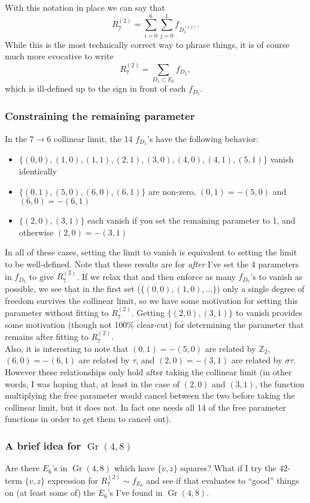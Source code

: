 \documentclass[12pt]{article}
\DeclareMathOperator{\Gr}{Gr}
\def\fd5{f_{D_5}}
\def\d5{D_5}
\def\e6{E_6}
\def\r27{R^{(2)}_7}
\begin{document}
With this notation in place we can say that 
\begin{equation}
	\r27 = \sum_{i=0}^{6}\sum_{j=0}^{1} f_{D_5^{(i,j)}}.
\end{equation}
While this is the most technically correct way to phrase things, it is of course much more evocative to write
\begin{equation}
	\r27 = \sum_{\d5\subset\e6} f_{D_5},
\end{equation}
which is ill-defined up to the sign in front of each $\fd5$. 


\subsubsection*{Constraining the remaining parameter}

In the $7\to6$ collinear limit, the 14 $\fd5$'s have the following behavior:

\begin{itemize}
	\item $\{(0, 0), (1, 0), (1, 1), (2, 1), (3, 0), (4, 0), (4, 1), (5, 1)\}$ vanish identically
	\item $\{(0, 1), (5, 0), (6, 0), (6, 1)\}$ are non-zero, $(0, 1)=-(5, 0)$ and $(6, 0)=-(6, 1)$
	\item $\{(2, 0), (3, 1)\}$ each vanish if you set the remaining parameter to 1, and otherwise $(2, 0)=-(3, 1)$
\end{itemize}
In all of these cases, setting the limit to vanish is equivalent to setting the limit to be well-defined. Note that these results are for \emph{after} I've set the 4 parameters in $\fd5$ to give $\r27$. If we relax that and then enforce as many $\fd5$'s to vanish as possible, we see that in the first set ($\{(0, 0), (1, 0), \ldots\}$) only a single degree of freedom survives the collinear limit, so we have some motivation for setting this parameter without fitting to $\r27$. Getting $\{(2, 0), (3, 1)\}$ to vanish provides some motivation (though not 100\% clear-cut) for determining the parameter that remains after fitting to $\r27$. \\

Also, it is interesting to note that $(0, 1)=-(5, 0)$ are related by $\mathbb{Z}_2$, $(6, 0)=-(6, 1)$ are related by $\tau$, and $(2, 0)=-(3, 1)$ are related by $\sigma\tau$. However these relationships only hold after taking the collinear limit (in other words, I was hoping that, at least in the case of $(2, 0)$ and $(3, 1)$, the function multiplying the free parameter would cancel between the two before taking the collinear limit, but it does not. In fact one needs all 14 of the free parameter functions in order to get them to cancel out).\\

\subsubsection*{A brief idea for $\Gr(4,8)$}

Are there $\e6$'s in $\Gr(4,8)$ which have $\{v,z\}$ squares? What if I try the 42-term $\{v,z\}$ expression for $\r27 \sim f_{E_6}$ and see if that evaluates to ``good'' things on (at least some of) the $\e6$'s I've found in $\Gr(4,8)$.
\end{document}
